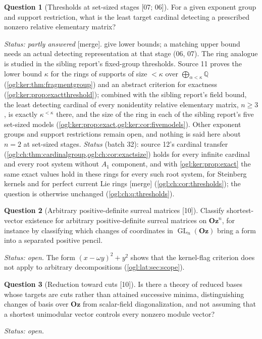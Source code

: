 \documentclass[11pt,oneside]{article}
\numberwithin{equation}{section}
\theoremstyle{definition}
\newtheorem{question}[question]{Question}
\theoremstyle{remark}
\newcommand{\Oz}{\mathbf{Oz}}
\newcommand{\Q}{\mathbb Q}
\newcommand{\GL}{\operatorname{GL}}
\newcommand{\src}[1]{\textup{\textsf{\small[#1]}}}
\newcommand{\mergetag}{\textup{\textsf{\small[merge]}}}
\begin{document}
\begin{question}[Thresholds at set-sized stages \src{07; 06}]\label{ogl:q:thresholds}
For a given exponent group and support restriction, what is the least target
cardinal detecting a prescribed nonzero relative elementary matrix?
\end{question}
\emph{Status: partly answered} \mergetag. 
give lower bounds; a matching upper bound needs an actual detecting
representation at that stage (06, 07). The ring analogue is studied in the
sibling report's fixed-group thresholds. Source 11 proves the lower bound
$\kappa$ for the rings of supports of size $<\kappa$ over
$\bigoplus_{\alpha<\kappa}\Q$ (\cref{ogl:ker:thm:fragmentgroup}) and an abstract
criterion for exactness (\cref{ogl:ker:prop:exactthreshold}); combined with the
sibling report's field bound, the least detecting cardinal of every nonidentity
relative elementary matrix, $n\ge3$, is exactly $\kappa^{<\kappa}$ there, and the
size of the ring in each of the sibling report's five set-sized models
(\cref{ogl:ker:prop:exact,ogl:ker:cor:fivemodels}). Other exponent groups and
support restrictions remain open, and nothing is said here about $n=2$ at
set-sized stages. \emph{Status} (batch 32): source 12's cardinal transfer
(\cref{ogl:ch:thm:cardinalgroup,ogl:ch:cor:exactsize}) holds for every infinite
cardinal and every root system without $A_1$ component, and with
\cref{ogl:ker:prop:exact} the same exact values hold in these rings for every
such root system, for Steinberg kernels and for perfect current Lie rings
\mergetag{} (\cref{ogl:ch:cor:thresholds}); the question is otherwise unchanged
(\cref{ogl:ch:q:thresholds}).

\begin{question}[Arbitrary positive-definite surreal matrices \src{10}]\label{ogl:q:general}
Classify shortest-vector existence for arbitrary positive-definite surreal
matrices on $\Oz^n$, for instance by classifying which changes of coordinates in
$\GL_n(\Oz)$ bring a form into a separated positive pencil.
\end{question}
\emph{Status: open.} The form $(x-\omega y)^2+y^2$ shows that the kernel-flag
criterion does not apply to arbitrary decompositions (\cref{ogl:lat:sec:scope}).

\begin{question}[Reduction toward cuts \src{10}]\label{ogl:q:cuts}
Is there a theory of reduced bases whose targets are cuts rather than attained
successive minima, distinguishing changes of basis over $\Oz$ from scalar-field
diagonalization, and not assuming that a shortest unimodular vector controls every
nonzero module vector?
\end{question}
\emph{Status: open.}
\end{document}
